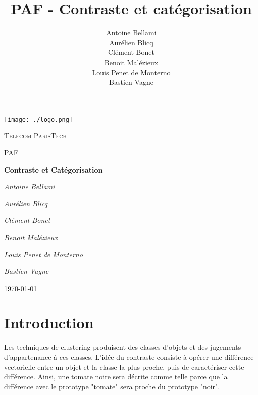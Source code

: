 \documentclass[a4paper,10pt]{article}
\title{PAF - Contraste et catégorisation}
\author{Antoine Bellami\\Aurélien Blicq\\Clément Bonet\\Benoit Malézieux\\Louis Penet de Monterno\\Bastien Vagne}
\begin{document}
\begin{titlepage}

	\centering
	\texttt{[image: ./logo.png]}\par\vspace{1cm}
	{\scshape\LARGE Telecom ParisTech \par}
	\vspace{1cm}
	{\scshape\Large PAF\par}
	\vspace{1.5cm}
	{\huge\bfseries Contraste et Catégorisation\par}
	\vspace{2cm}
	{\Large\itshape Antoine Bellami\par}
    {\Large\itshape Aurélien Blicq\par}
    {\Large\itshape Clément Bonet\par}
    {\Large\itshape Benoit Malézieux\par}
    {\Large\itshape Louis Penet de Monterno\par}
    {\Large\itshape Bastien Vagne\par}

	\vfill

	{\large \today\par}
\end{titlepage}


\newpage

\renewcommand{\contentsname}{Sommaire} 
\tableofcontents

\newpage


\section{Introduction}

Les techniques de clustering produisent des classes d’objets et des jugements d’appartenance à ces classes.
L’idée du contraste consiste à opérer une différence vectorielle entre un objet et la classe la plus proche, puis de caractériser cette différence. Ainsi, une tomate noire sera décrite comme telle parce que la différence avec le prototype "tomate" sera proche du prototype "noir".

\paragraph{}
\end{document}
